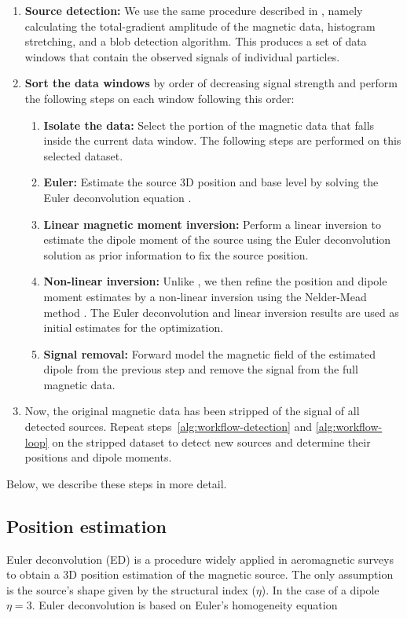 \documentclass[onecolumn,12pt,a4paper]{article}
\begin{document}
\begin{enumerate}
    \item \textbf{Source detection:} We use the same procedure described in \citet{Souza-Junior2024}, namely calculating the total-gradient amplitude of the magnetic data, histogram stretching, and a blob detection algorithm. This produces a set of data windows that contain the observed signals of individual particles. 
    \label{alg:workflow-detection}
    \item \textbf{Sort the data windows} by order of decreasing signal strength and perform the following steps on each window following this order:
    \label{alg:workflow-loop}
    \begin{enumerate}
        \item \textbf{Isolate the data:} Select the portion of the magnetic data that falls inside the current data window. The following steps are performed on this selected dataset.
        \item \textbf{Euler:} Estimate the source 3D position and base level by solving the Euler deconvolution equation \citep{Reid1990}.
        \item \textbf{Linear magnetic moment inversion:} Perform a linear inversion to estimate the dipole moment of the source using the Euler deconvolution solution as prior information to fix the source position.
        \item \textbf{Non-linear inversion:} Unlike \citet{Souza-Junior2024}, we then refine the position and dipole moment estimates by a non-linear inversion using the Nelder-Mead method \citep{Nelder-Mead1965,Gao2010}. The Euler deconvolution and linear inversion results are used as initial estimates for the optimization.
        \item \textbf{Signal removal:} Forward model the magnetic field of the estimated dipole from the previous step and remove the signal from the full magnetic data. 
    \end{enumerate}
    \item Now, the original magnetic data has been stripped of the signal of all detected sources. Repeat steps~\ref{alg:workflow-detection} and \ref{alg:workflow-loop} on the stripped dataset to detect new sources and determine their positions and dipole moments.
\end{enumerate}

\noindent
Below, we describe these steps in more detail.

\subsection{Position estimation}
    Euler deconvolution (ED) \citep{Reid1990} is a procedure widely applied in aeromagnetic surveys \citep{Barbosa2011, Melo2013} to obtain a 3D position estimation of the magnetic source. The only assumption is the source's shape given by the structural index ($\eta$).
    In the case of a dipole $\eta = 3$. Euler deconvolution is based on Euler's homogeneity equation
\end{document}
